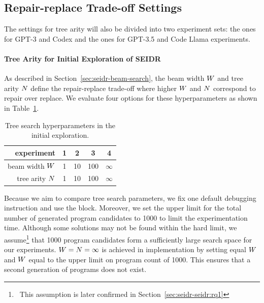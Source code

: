 \newpage \subsection{Repair-replace Trade-off Settings}
\label{sec:seidr-trade-off-settings}

The settings for tree arity will also be divided into two experiment sets: the ones for GPT-3 and Codex and the ones for GPT-3.5 and Code Llama experiments.

\paragraph{Tree Arity for Initial Exploration of SEIDR}
\label{sec:seidr-tree-arity-gpt-3}
As described in Section~\ref{sec:seidr-beam-search}, the beam width $W{}$ and tree arity $N{}$ define the repair-replace trade-off where higher $W{}$ and $N{}$ correspond to repair over replace. 
We evaluate four options for these hyperparameters as shown in Table~\ref{tab:seidr:w-n}. 

\begin{table}[h]
    \centering
    \caption{Tree search hyperparameters in the initial exploration.}\small
    \label{tab:seidr:w-n}%
    \begin{tabular}{r|c|c|c|c}
    experiment & 1 & 2 & 3 & 4 \\
    \midrule
     beam width $W{}$ & 1 & 10 & 100 & $\infty$ \\
     tree arity $N{}$ & 1 & 10 & 100 & $\infty$
    \end{tabular}
\end{table}

Because we aim to compare tree search parameters, we fix one default debugging instruction and use the \instructs{} block. 
Moreover, we set the upper limit for the total number of generated program candidates to 1000 to limit the experimentation time. 
Although some solutions may not be found within the hard limit, we assume\footnote{~This assumption is later confirmed in Section~\ref{sec:seidr-seidr:rq1}} that 1000 program candidates form a sufficiently large search space for our experiments.
$W{} = N{} = \infty$ is achieved in implementation by setting equal $W{}$ and $W{}$ equal to the upper limit on program count of 1000.
This ensures that a second generation of programs does not exist.


